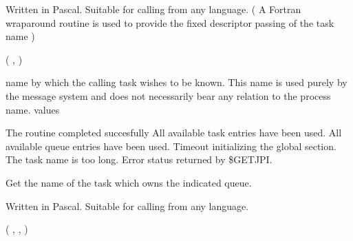 \begin{appendix}
\begin{manroutinedescription}
      Written in Pascal. Suitable for calling from any language.
      ( A Fortran wraparound routine is used to provide the fixed
      descriptor passing of the task name )

      {} {\mantt{=}} {} ( {}, {} )

\begin{manparametertable}
                       name by which the calling task wishes to
                       be known. This name is used purely by the
                       message system and does not necessarily
                       bear any relation to the {} process name.
      {} values
\end{manparametertable}
\begin{mantwocolumntable}
        The routine completed %
succesfully
  All available task entries %
have been
                                used.
  All available queue %
entries have been
                                used.
   Timeout initializing the %
global section.
   The task name is too long.
   Error status returned by \$GETJPI.
\end{mantwocolumntable}
\end{manroutinedescription}
\begin{manroutinedescription}
      Get the name of the task which owns the indicated queue.

      Written in Pascal. Suitable for calling from any language.

      {} {\mantt{=}} {} ( {}, {}, {} )


\end{manroutinedescription}
\end{appendix}
